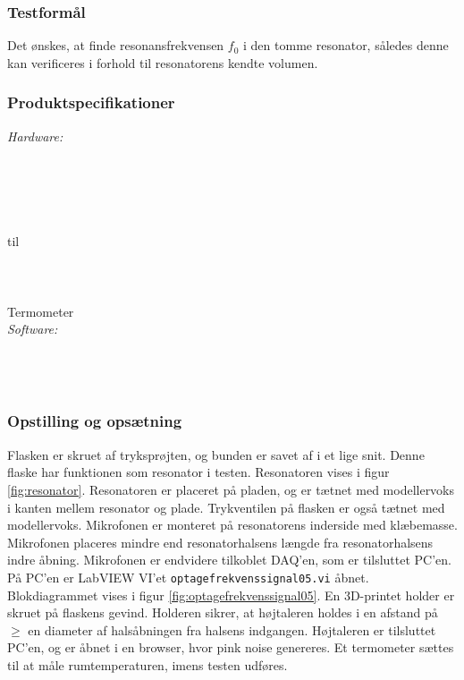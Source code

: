 		\subsubsection{Testformål}
	Det ønskes, at finde resonansfrekvensen $f_{0}$ i den tomme resonator, således denne kan verificeres i forhold til resonatorens kendte volumen.  	
	
	\subsubsection{Produktspecifikationer}
	\textit{Hardware:}\\
	\\
	\elektretto\\
	\daq\\
	\\	
	\snot\\	
	 til \\
	\modellervoks\\
	\plade\\
	\PC\\
	Termometer\\
	
	\textit{Software:}\\
	\labview\\
	\daqsoft\\
	\onlineg\\
	
		\subsubsection{Opstilling og opsætning}
	Flasken er skruet af tryksprøjten, og bunden er savet af i et lige snit. Denne flaske har funktionen som resonator i testen. Resonatoren vises i figur \ref{fig:resonator}. Resonatoren er placeret på pladen, og er tætnet med modellervoks i kanten mellem resonator og plade. Trykventilen på flasken er også tætnet med modellervoks.
Mikrofonen er monteret på resonatorens inderside med klæbemasse. Mikrofonen placeres mindre end resonatorhalsens længde fra  resonatorhalsens indre åbning. Mikrofonen er endvidere tilkoblet DAQ'en, som er tilsluttet PC'en. På PC'en er LabVIEW VI'et \texttt{optagefrekvenssignal05.vi} åbnet. Blokdiagrammet vises i figur \ref{fig:optagefrekvenssignal05}. En 3D-printet holder er skruet på flaskens gevind. Holderen sikrer, at højtaleren holdes i en afstand på $\geq$ en diameter af halsåbningen fra halsens indgangen. Højtaleren er tilsluttet PC'en, og \onlineg er åbnet i en browser, hvor pink noise genereres. 
	Et termometer sættes til at måle rumtemperaturen, imens testen udføres. 
	
